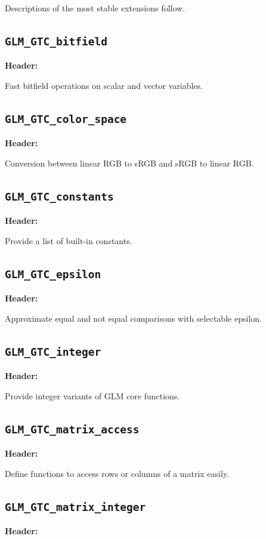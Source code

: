 \documentclass{scrartcl}
\numberwithin{figure}{subsection}
\begin{document}
Descriptions of the most stable extensions follow.

\subsection{\texttt{GLM\_GTC\_bitfield}}
\textbf{Header:} 

Fast bitfield operations on scalar and vector variables.

\subsection{\texttt{GLM\_GTC\_color\_space}}
\textbf{Header:} 

Conversion between linear RGB to sRGB and sRGB to linear RGB.

\subsection{\texttt{GLM\_GTC\_constants}}
\textbf{Header:} 

Provide a list of built-in constants.

\subsection{\texttt{GLM\_GTC\_epsilon}}
\textbf{Header:} 

Approximate equal and not equal comparisons with selectable epsilon.

\subsection{\texttt{GLM\_GTC\_integer}}
\textbf{Header:} 

Provide integer variants of GLM core functions. 

\subsection{\texttt{GLM\_GTC\_matrix\_access}}
\textbf{Header:} 

Define functions to access rows or columns of a matrix easily.

\subsection{\texttt{GLM\_GTC\_matrix\_integer}}
\textbf{Header:} 
\end{document}
